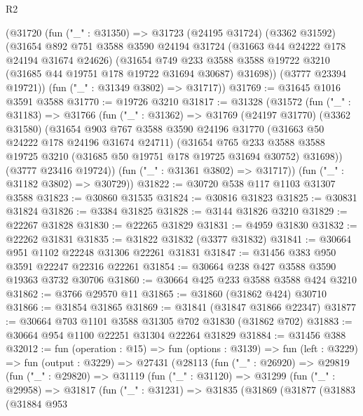 \begin{lexlean}{R2}
\begin{coremodule}
    (@31720
      (fun ("_" : @31350) =>
      @31723
        (@24195 @31724)
        (@3362 @31592)
        (@31654
          @892
          @751
          @3588
          @3590
          @24194
          @31724
          (@31663 @44 @24222 @178 @24194 @31674 @24626)
          (@31654
            @749
            @233
            @3588
            @3588
            @19722
            @3210
            (@31685 @44 @19751 @178 @19722 @31694 @30687)
            @31698))
        (@3777 @23394 @19721))
      (fun ("_" : @31349 @3802) => @31717))
@31769 := @31645 @1016 @3591 @3588
@31770 := @19726 @3210
@31817 := @31328
    (@31572
      (fun ("_" : @31183) =>
      @31766
        (fun ("_" : @31362) =>
        @31769
          (@24197 @31770)
          (@3362 @31580)
          (@31654
            @903
            @767
            @3588
            @3590
            @24196
            @31770
            (@31663 @50 @24222 @178 @24196 @31674 @24711)
            (@31654
              @765
              @233
              @3588
              @3588
              @19725
              @3210
              (@31685 @50 @19751 @178 @19725 @31694 @30752)
              @31698))
          (@3777 @23416 @19724))
        (fun ("_" : @31361 @3802) => @31717))
      (fun ("_" : @31182 @3802) => @30729))
@31822 := @30720 @538 @117 @1103 @31307 @3588
@31823 := @30860 @31535
@31824 := @30816 @31823
@31825 := @30831 @31824
@31826 := @3384 @31825
@31828 := @3144 @31826 @3210
@31829 := @22267 @31828
@31830 := @22265 @31829
@31831 := @4959 @31830
@31832 := @22262 @31831
@31835 := @31822 @31832 (@3377 @31832)
@31841 := @30664 @951 @1102 @22248 @31306 @22261 @31831
@31847 := @31456 @383 @950 @3591 @22247 @22316 @22261
@31854 := @30664 @238 @427 @3588 @3590 @19363 @3732 @30706
@31860 := @30664 @425 @233 @3588 @3588 @424 @3210
@31862 := @3766 @29570 @11
@31865 := @31860 (@31862 @424) @30710
@31866 := @31854 @31865
@31869 := @31841 (@31847 @31866 @22347)
@31877 := @30664 @703 @1101 @3588 @31305 @702 @31830 (@31862 @702)
@31883 := @30664 @954 @1100 @22251 @31304 @22264 @31829
@31884 := @31456 @388
@32012 := fun (operation : @15) =>
  fun (options : @3139) =>
  fun (left : @3229) =>
  fun (output : @3229) =>
  @27431
    (@28113
      (fun ("_" : @26920) =>
      @29819
        (fun ("_" : @29820) =>
        @31119
          (fun ("_" : @31120) =>
          @31299
            (fun ("_" : @29958) =>
            @31817
              (fun ("_" : @31231) =>
              @31835
                (@31869
                  (@31877
                    (@31883
                      (@31884
                        @953

\end{coremodule}
\end{lexlean}
